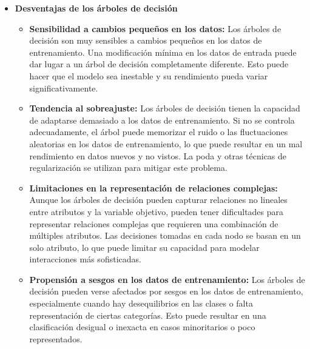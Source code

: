\begin{itemize}
    \item \textbf{Desventajas de los árboles de decisión}
    \begin{itemize}
        \item \textbf{Sensibilidad a cambios pequeños en los datos:} Los árboles de decisión son muy sensibles a cambios pequeños en los datos de entrenamiento. Una modificación mínima en los datos de entrada puede dar lugar a un árbol de decisión completamente diferente. Esto puede hacer que el modelo sea inestable y su rendimiento pueda variar significativamente.
        \item \textbf{Tendencia al sobreajuste:} Los árboles de decisión tienen la capacidad de adaptarse demasiado a los datos de entrenamiento. Si no se controla adecuadamente, el árbol puede memorizar el ruido o las fluctuaciones aleatorias en los datos de entrenamiento, lo que puede resultar en un mal rendimiento en datos nuevos y no vistos. La poda y otras técnicas de regularización se utilizan para mitigar este problema.
        \item \textbf{Limitaciones en la representación de relaciones complejas:} Aunque los árboles de decisión pueden capturar relaciones no lineales entre atributos y la variable objetivo, pueden tener dificultades para representar relaciones complejas que requieren una combinación de múltiples atributos. Las decisiones tomadas en cada nodo se basan en un solo atributo, lo que puede limitar su capacidad para modelar interacciones más sofisticadas.
        \item \textbf{Propensión a sesgos en los datos de entrenamiento:} Los árboles de decisión pueden verse afectados por sesgos en los datos de entrenamiento, especialmente cuando hay desequilibrios en las clases o falta representación de ciertas categorías. Esto puede resultar en una clasificación desigual o inexacta en casos minoritarios o poco representados.
    \end{itemize}
\end{itemize}